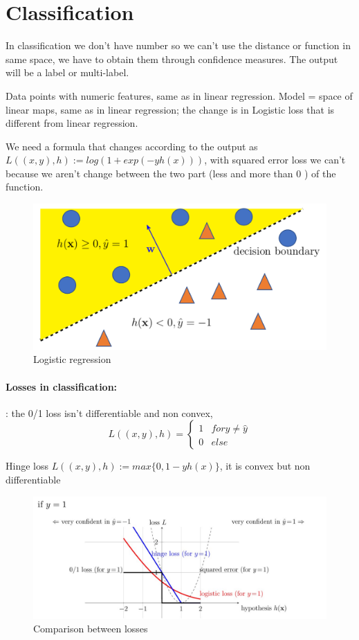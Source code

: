 \section{Classification}

In classification we don't have number so we can't use the distance or function in same space, we have to obtain them through confidence measures. The output will be a label or multi-label.

Data points with numeric features, same as in linear regression. Model = space of linear maps, same as in linear regression; the change is in Logistic loss that is different from linear regression.

We need a formula that changes according to the output as $ L((x,y) ,h) := log (1+exp (-yh(x))) $, with squared error loss we can't because we aren't change between the two part (less and more than 0 ) of the function.

\begin{figure}[H]
    \centering
    \includegraphics[scale=0.3]{images/ERM/ERM5.png}
    \caption{Logistic regression}
    \label{fig:enter-label}
\end{figure}


\paragraph{Losses in classification:}: the 0/1 loss isn't differentiable and non convex, 
\begin{equation}
   L((x,y), h) =
    \begin{cases}
     1 & for y \ne \hat{y} \\
     0 & else
    \end{cases}       
\end{equation}

Hinge loss $L((x,y), h) := max \{ 0,1 - yh(x) \}$, it is convex but non differentiable

\begin{figure}[H]
    \centering
    \includegraphics[scale=0.4]{images/ERM/ERM6.png}
    \caption{Comparison between losses}
    \label{fig:enter-label}
\end{figure}
